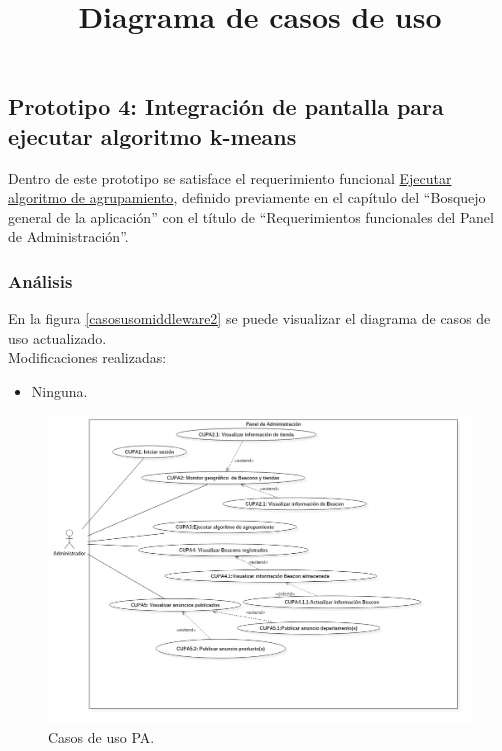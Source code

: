 \subsection{Prototipo 4: Integración de pantalla para ejecutar algoritmo k-means}
Dentro de este prototipo se satisface el requerimiento funcional \hyperlink{RFPA}{Ejecutar algoritmo de agrupamiento}, definido previamente en el capítulo del ``Bosquejo general de la aplicación''  con el título de ``Requerimientos funcionales del Panel de Administración''. \\ \par

\FloatBarrier

\subsubsection{Análisis}

\title{\textbf{Diagrama de casos de uso \\}}
En la figura \ref{casosusomiddleware2} se puede visualizar el diagrama de casos de uso actualizado.
\\
Modificaciones realizadas: 
\begin{itemize}
\item Ninguna.
\end{itemize}

\FloatBarrier
\begin{figure}[htbp!]
		\centering
			\includegraphics[width=1.1 \textwidth]{imagenes/CU/middleware}
		\caption{Casos de uso PA.}
		\label{casosdeusoPA}
\end{figure}
\FloatBarrier

